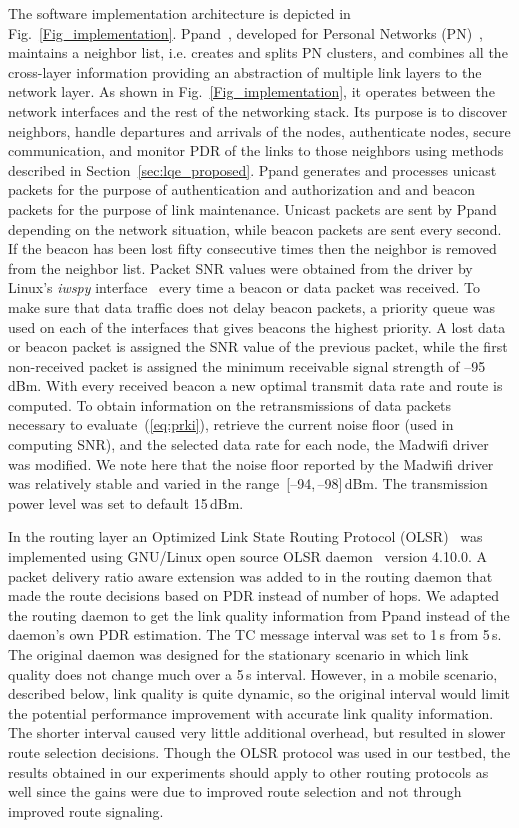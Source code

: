 \documentclass[11pt,draftclsnofoot,journal,onecolumn]{IEEEtran}
\begin{document}
The software implementation architecture is depicted in Fig.~\ref{Fig_implementation}. Ppand~\cite{Jacobsson_phd_thesis}, developed for Personal Networks (PN)~\cite{Niemegeers_WPC2004}, maintains a neighbor list, i.e. creates and splits PN clusters, and combines all the cross-layer information providing an abstraction of multiple link layers to the network layer. As shown in Fig.~\ref{Fig_implementation}, it operates between the network interfaces and the rest of the networking stack. Its purpose is to discover neighbors, handle departures and arrivals of the nodes, authenticate nodes, secure communication, and monitor PDR of the links to those neighbors using methods described in Section~\ref{sec:lqe_proposed}. Ppand generates and processes unicast packets for the purpose of authentication and authorization and and beacon packets for the purpose of link maintenance. Unicast packets are sent by Ppand depending on the network situation, while beacon packets are sent every second. If the beacon has been lost fifty consecutive times then the neighbor is removed from the neighbor list. Packet SNR values were obtained from the driver by Linux's \textit{iwspy} interface~\cite{www:wireless_tools} every time a beacon or data packet was received. To make sure that data traffic does not delay beacon packets, a priority queue was used on each of the interfaces that gives beacons the highest priority. A lost data or beacon packet is assigned the SNR value of the previous packet, while the first non-received packet is assigned the minimum receivable signal strength of --95\,dBm. With every received beacon a new optimal transmit data rate and route is computed. To obtain information on the retransmissions of data packets necessary to evaluate~(\ref{eq:prki}), retrieve the current noise floor (used in computing SNR), and the selected data rate for each node, the Madwifi driver was modified. We note here that the noise floor reported by the Madwifi driver was relatively stable and varied in the range \,[--94,\,--98]\,dBm. The transmission power level was set to default 15\,dBm.

In the routing layer an Optimized Link State Routing Protocol (OLSR)~\cite{RFC_OLSR} was implemented using GNU/Linux open source OLSR daemon~\cite{Olsrd} version 4.10.0. A packet delivery ratio aware extension was added to in the routing daemon that made the route decisions based on PDR instead of number of hops. We adapted the routing daemon to get the link quality information from Ppand instead of the daemon's own PDR estimation. The TC message interval was set to 1\,s from 5\,s. The original daemon was designed for the stationary scenario in which link quality does not change much over a 5\,s interval. However, in a mobile scenario, described below, link quality is quite dynamic, so the original interval would limit the potential performance improvement with accurate link quality information. The shorter interval caused very little additional overhead, but resulted in slower route selection decisions. Though the OLSR protocol was used in our testbed, the results obtained in our experiments should apply to other routing protocols as well since the gains were due to improved route selection and not through improved route signaling.
\end{document}
